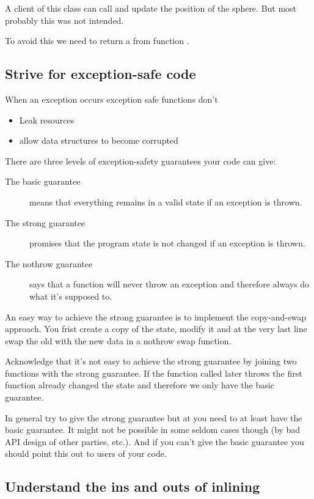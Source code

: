 \documentclass[a4paper, twocolumn]{article}
\let\oldsubsection\subsection
\newcounter{mysubsection}
\renewcommand{\subsection}{
    \stepcounter{mysubsection}
    \oldsubsection
}
\newcommand{\code}[1]{\texttt{\color{black}{#1}}}
\begin{document}
A client of this class can call \code{sphere.getCenter().set(a, b, c)} and update the position of the sphere. But most probably this was not intended.

To avoid this we need to return a \code{const Vector3} from function \code{getCenter}.

\subsection{Strive for exception-safe code}
\label{ssec:ExceptionSafeCode}
When an exception occurs exception safe functions don't
\begin{itemize}
	\item Leak resources
	\item allow data structures to become corrupted
\end{itemize}
There are three levels of exception-safety guarantees your code can give:
\begin{description}
	\item[The basic guarantee] means that everything remains in a valid state if an exception is thrown.
	\item[The strong guarantee] promises that the program state is not changed if an exception is thrown.
 	\item[The nothrow guarantee] says that a function will never throw an exception and therefore always do what it's supposed to.
\end{description}
An easy way to achieve the strong guarantee is to implement the copy-and-swap approach. You frist create a copy of the state, modify it and at the very last line swap the old with the new data in a nothrow swap function.

Acknowledge that it's not easy to achieve the strong guarantee by joining two functions with the strong guarantee. If the function called later throws the first function already changed the state and therefore we only have the basic guarantee.

In general try to give the strong guarantee but at you need to at least have the basic guarantee. It might not be possible in some seldom cases though (by bad API design of other parties, etc.). And if you can't give the basic guarantee you should point this out to users of your code.

\subsection{Understand the ins and outs of inlining}
\end{document}
